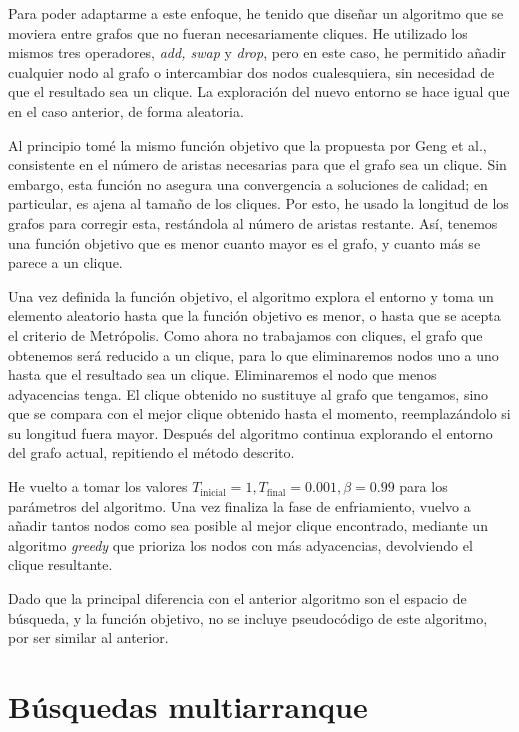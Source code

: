 Para poder adaptarme a este enfoque, he tenido que diseñar un algoritmo que se moviera
entre grafos que no fueran necesariamente cliques. He utilizado los mismos tres operadores,
\textit{add, swap} y \textit{drop}, pero en este caso, he permitido añadir cualquier nodo
al grafo o intercambiar dos nodos cualesquiera, sin necesidad de que el resultado sea un clique.
La exploración del nuevo entorno se hace igual que en el caso anterior, de forma aleatoria.

Al principio tomé la mismo función objetivo que la propuesta por Geng et al., consistente
en el número de aristas necesarias para que el grafo sea un clique. Sin embargo, esta
función no asegura una convergencia a soluciones de calidad; en particular, es ajena al
tamaño de los cliques. Por esto, he usado la longitud de los grafos para corregir esta,
restándola al número de aristas restante. Así, tenemos una función objetivo que es menor
cuanto mayor es el grafo, y cuanto más se parece a un clique.

Una vez definida la función objetivo, el algoritmo explora el entorno y toma un elemento
aleatorio hasta que la función objetivo es menor, o hasta que se acepta el criterio de
Metrópolis. Como ahora no trabajamos con cliques, el grafo que obtenemos será reducido
a un clique, para lo que eliminaremos nodos uno a uno hasta que el resultado sea un clique.
Eliminaremos el nodo que menos adyacencias tenga. El clique obtenido no sustituye al grafo
que tengamos, sino que se compara con el mejor clique obtenido hasta el momento, reemplazándolo
si su longitud fuera mayor. Después del algoritmo continua explorando el entorno del
grafo actual, repitiendo el método descrito.

He vuelto a tomar los valores $T_{\text{inicial}} = 1, T_{\text{final}} = 0.001,
\beta = 0.99$ para los parámetros del algoritmo. Una vez finaliza la fase de enfriamiento,
vuelvo a añadir tantos nodos como sea posible al mejor clique encontrado, mediante un algoritmo
\textit{greedy} que prioriza los nodos con más adyacencias, devolviendo el clique resultante.

Dado que la principal diferencia con el anterior algoritmo son el espacio de
búsqueda,  y la función objetivo, no se incluye pseudocódigo de este algoritmo,
por ser similar al anterior.


\section{Búsquedas multiarranque}

